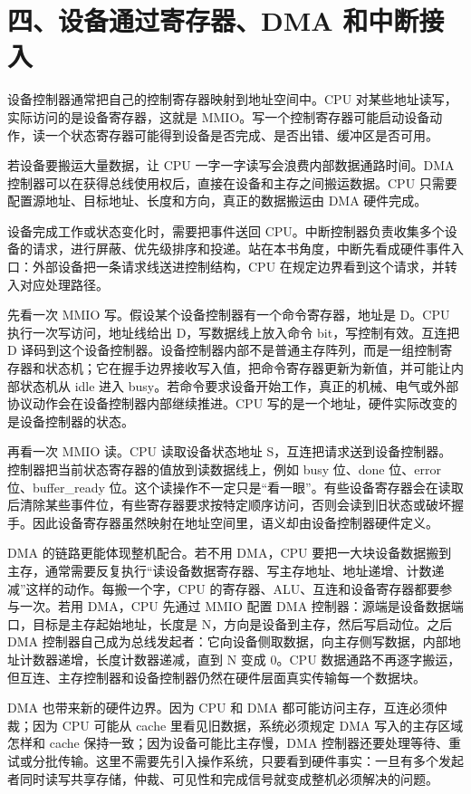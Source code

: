 \section{四、设备通过寄存器、DMA 和中断接入}

设备控制器通常把自己的控制寄存器映射到地址空间中。CPU 对某些地址读写，实际访问的是设备寄存器，这就是 MMIO。写一个控制寄存器可能启动设备动作，读一个状态寄存器可能得到设备是否完成、是否出错、缓冲区是否可用。

若设备要搬运大量数据，让 CPU 一字一字读写会浪费内部数据通路时间。DMA 控制器可以在获得总线使用权后，直接在设备和主存之间搬运数据。CPU 只需要配置源地址、目标地址、长度和方向，真正的数据搬运由 DMA 硬件完成。

设备完成工作或状态变化时，需要把事件送回 CPU。中断控制器负责收集多个设备的请求，进行屏蔽、优先级排序和投递。站在本书角度，中断先看成硬件事件入口：外部设备把一条请求线送进控制结构，CPU 在规定边界看到这个请求，并转入对应处理路径。

先看一次 MMIO 写。假设某个设备控制器有一个命令寄存器，地址是 D。CPU 执行一次写访问，地址线给出 D，写数据线上放入命令 bit，写控制有效。互连把 D 译码到这个设备控制器。设备控制器内部不是普通主存阵列，而是一组控制寄存器和状态机；它在握手边界接收写入值，把命令寄存器更新为新值，并可能让内部状态机从 idle 进入 busy。若命令要求设备开始工作，真正的机械、电气或外部协议动作会在设备控制器内部继续推进。CPU 写的是一个地址，硬件实际改变的是设备控制器的状态。

再看一次 MMIO 读。CPU 读取设备状态地址 S，互连把请求送到设备控制器。控制器把当前状态寄存器的值放到读数据线上，例如 busy 位、done 位、error 位、buffer\_ready 位。这个读操作不一定只是“看一眼”。有些设备寄存器会在读取后清除某些事件位，有些寄存器要求按特定顺序访问，否则会读到旧状态或破坏握手。因此设备寄存器虽然映射在地址空间里，语义却由设备控制器硬件定义。

DMA 的链路更能体现整机配合。若不用 DMA，CPU 要把一大块设备数据搬到主存，通常需要反复执行“读设备数据寄存器、写主存地址、地址递增、计数递减”这样的动作。每搬一个字，CPU 的寄存器、ALU、互连和设备寄存器都要参与一次。若用 DMA，CPU 先通过 MMIO 配置 DMA 控制器：源端是设备数据端口，目标是主存起始地址，长度是 N，方向是设备到主存，然后写启动位。之后 DMA 控制器自己成为总线发起者：它向设备侧取数据，向主存侧写数据，内部地址计数器递增，长度计数器递减，直到 N 变成 0。CPU 数据通路不再逐字搬运，但互连、主存控制器和设备控制器仍然在硬件层面真实传输每一个数据块。

DMA 也带来新的硬件边界。因为 CPU 和 DMA 都可能访问主存，互连必须仲裁；因为 CPU 可能从 cache 里看见旧数据，系统必须规定 DMA 写入的主存区域怎样和 cache 保持一致；因为设备可能比主存慢，DMA 控制器还要处理等待、重试或分批传输。这里不需要先引入操作系统，只要看到硬件事实：一旦有多个发起者同时读写共享存储，仲裁、可见性和完成信号就变成整机必须解决的问题。


